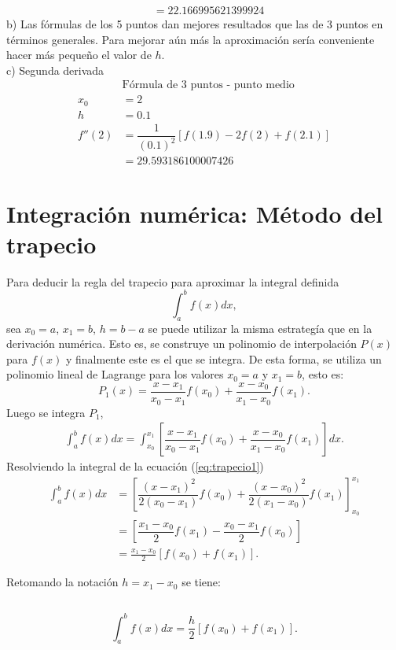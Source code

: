 \begin{exerciseT}
\begin{align*}
			&= 22.166995621399924
	\end{align*}
	b) Las fórmulas de los 5 puntos dan mejores resultados que las de 3 puntos en términos generales. Para 
	mejorar aún más la aproximación sería conveniente hacer más pequeño el valor de $h$.\\
	c) Segunda derivada
	\begin{align*}
		&\mbox{Fórmula de 3 puntos - punto medio}\\
		x_0 &= 2\\
		h &= 0.1\\
		f''(2) &= \dfrac{1}{(0.1)^2}\left[f(1.9)-2f(2)+f(2.1)\right]\\
			&= 29.593186100007426
	\end{align*}
\end{exerciseT}

\section{Integración numérica: Método del trapecio}
Para deducir la regla del trapecio para aproximar la integral definida \[\int_a^b f(x)dx, \] sea $x_0=a$, $x_1=b$, $h=b-a$  se puede
utilizar la misma estrategía que en la derivación numérica. Esto es, se construye un polinomio de interpolación $P(x)$ para $f(x)$ 
y finalmente este es el que se integra. De esta forma, se utiliza un polinomio lineal de Lagrange para los valores $x_0=a$ y $x_1=b$,
esto es: 
\[ P_1(x) = \dfrac{x-x_1}{x_0-x_1}f(x_0) + \dfrac{x-x_0}{x_1-x_0}f(x_1).\]
Luego se integra $P_1$,
\begin{align}
  \int_a^b f(x)dx = \int_{x_0}^{x_1} \left[ \dfrac{x-x_1}{x_0-x_1}f(x_0) + \dfrac{x-x_0}{x_1-x_0}f(x_1)  \right]dx.
  \label{eq:trapecio1}
\end{align}
Resolviendo la integral de la ecuación (\ref{eq:trapecio1})
\begin{align*}
  \int_a^b f(x)dx &= \left[ \dfrac{(x-x_1)^2}{2(x_0-x_1) }f(x_0) + \dfrac{(x-x_0)^2}{2(x_1-x_0)}f(x_1) \right]_{x_0}^{x_1} \\
	&= \left[ \dfrac{x_1-x_0}{2}f(x_1) - \dfrac{x_0-x_1}{2}f(x_0) \right] \\
  	&= \frac{x_1-x_0}{2}\left[f(x_0) + f(x_1)\right].
\end{align*}

Retomando la notación $h=x_1-x_0$ se tiene:
\subsection*{}
\begin{definitionT}
	\begin{equation}
		\int_a^b f(x)dx = \dfrac{h}{2}\left[f(x_0) + f(x_1)\right].
		\label{eq:reglaTrapecio} 
	\end{equation}	
\end{definitionT}

